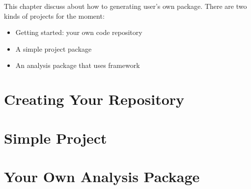 
This chapter discuss about how to generating user's own package. 
There are two kinds of projects for the moment:
\begin{itemize}
\item Getting started: your own code repository
\item A simple \CPP project package 
\item An analysis package that uses \Analysis framework
\end{itemize}

\section{Creating Your Repository}
\label{sec:devrepo}


\section{Simple \CPP Project}
\label{sec:simplecpp}


\section{Your Own Analysis Package}
\label{sec:yourana}

